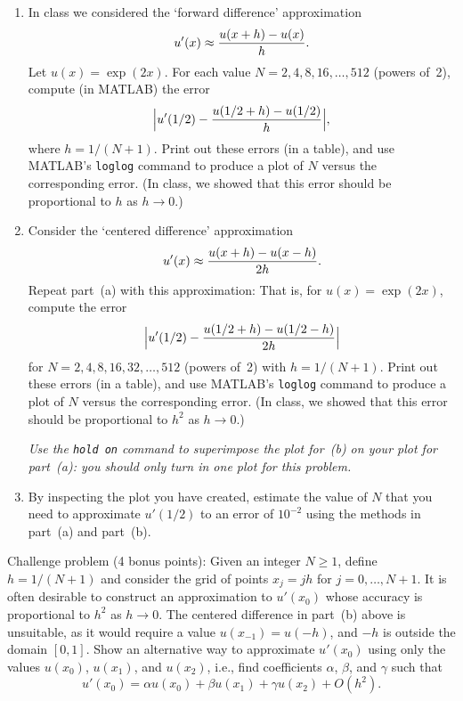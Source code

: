 \begin{enumerate}
\item In class we considered the `forward difference' approximation
      \[ u'(x) \approx {u(x+h) - u(x) \over h}.\]
      Let $u(x) = \exp(2x)$.  For each value 
      $N = 2, 4, 8, 16, \ldots, 512$ (powers of~2), compute (in MATLAB) the error
         \[ \Big| u'(1/2) -  {u(1/2+h) - u(1/2) \over h}\Big|,\]
      where $h = 1/(N+1)$.
      Print out these errors (in a table), and use MATLAB's \verb|loglog| command to 
      produce a plot of $N$ versus the corresponding error.
      (In class, we showed that this error should be proportional to $h$
       as $h\to 0$.)
      
\vspace*{1em} 
\item Consider the `centered difference' approximation
      \[ u'(x) \approx {u(x+h) - u(x-h) \over 2 h}.\]
      Repeat part~(a) with this approximation:
      That is, for $u(x) = \exp(2x)$, compute the error
         \[ \Big| u'(1/2) -  {u(1/2+h) - u(1/2-h) \over 2h}\Big|\]
      for $N = 2, 4, 8, 16, 32, \ldots, 512$ (powers of~2) with $h=1/(N+1)$.  
      Print out these errors (in a table), and use MATLAB's \verb|loglog| command to 
      produce a plot of $N$ versus the corresponding error.
      (In class, we showed that this error should be proportional to $h^2$
       as $h\to 0$.)

      \emph{Use the {\tt hold on} command to superimpose the plot for~(b)
      on your plot for part~(a):  you should only turn in one plot for
      this problem.}      

\item By inspecting the plot you have created, estimate the value of $N$ that you
      need to approximate $u'(1/2)$ to an error of $10^{-2}$ using the methods
      in part~(a) and part~(b).
\end{enumerate}

\vspace*{2em}
Challenge problem (4 bonus points):  Given an integer $N\ge 1$, 
define $h = 1/(N+1)$ and consider the grid of points $x_j = jh$
for $j=0, \ldots, N+1$.
It is often desirable to construct an
approximation to $u'(x_0)$ whose accuracy is proportional to $h^2$
as $h\to0$.  
The centered difference in part~(b)
above is unsuitable, as it would require a value $u(x_{-1}) = u(-h)$, and
$-h$ is outside the domain $[0,1]$.
Show an alternative way to approximate
$u'(x_0)$ using only the values $u(x_0)$, $u(x_1)$, and $u(x_2)$, i.e.,
find coefficients $\alpha$, $\beta$, and $\gamma$ such that
\[ u'(x_0) = \alpha u(x_0) + \beta u(x_1) + \gamma u(x_2) + O(h^2).\]




